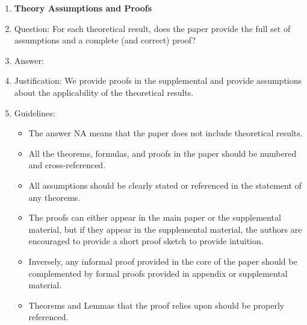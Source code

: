 \documentclass{article} %
\newcounter{ct}
\theoremstyle{definition}
\theoremstyle{remark}
\begin{document}
\begin{enumerate}
\item {\bf Theory Assumptions and Proofs}
    \item[] Question: For each theoretical result, does the paper provide the full set of assumptions and a complete (and correct) proof?
    \item[] Answer: \answerYes{} %
    \item[] Justification: We provide proofs in the supplemental and provide assumptions about the applicability of the theoretical results.
    \item[] Guidelines:
    \begin{itemize}
        \item The answer NA means that the paper does not include theoretical results.
        \item All the theorems, formulas, and proofs in the paper should be numbered and cross-referenced.
        \item All assumptions should be clearly stated or referenced in the statement of any theorems.
        \item The proofs can either appear in the main paper or the supplemental material, but if they appear in the supplemental material, the authors are encouraged to provide a short proof sketch to provide intuition.
        \item Inversely, any informal proof provided in the core of the paper should be complemented by formal proofs provided in appendix or supplemental material.
        \item Theorems and Lemmas that the proof relies upon should be properly referenced.
    \end{itemize}


\end{enumerate}
\end{document}
